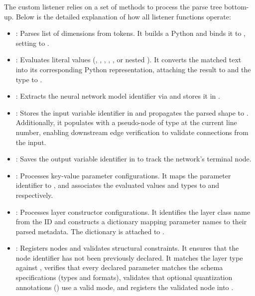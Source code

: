 \documentclass{nngraph-en}
\begin{document}
The custom listener relies on a set of  methods to process the parse tree bottom-up. Below is the detailed explanation of how all listener functions operate:

\begin{itemize}
    \item \textbf{}: Parses list of dimensions from  tokens. It builds a Python  and binds it to , setting  to .
    \item \textbf{}: Evaluates literal values (, , , , , or nested ). It converts the matched text into its corresponding Python representation, attaching the result to  and the type to .
    \item \textbf{}: Extracts the neural network model identifier via  and stores it in .
    \item \textbf{}: Stores the input variable identifier in  and propagates the parsed shape to . Additionally, it populates  with a pseudo-node of type  at the current line number, enabling downstream edge verification to validate connections from the input.
    \item \textbf{}: Saves the output variable identifier in  to track the network's terminal node.
    \item \textbf{}: Processes key-value parameter configurations. It maps the parameter identifier to , and associates the evaluated values and types to  and  respectively.
    \item \textbf{}: Processes layer constructor configurations. It identifies the layer class name from the ID and constructs a dictionary mapping parameter names to their parsed metadata. The dictionary is attached to .
    \item \textbf{}: Registers nodes and validates structural constraints. It ensures that the node identifier has not been previously declared. It matches the layer type against , verifies that every declared parameter matches the schema specifications (types and formats), validates that optional quantization annotations () use a valid mode, and registers the validated node into .

\end{itemize}
\end{document}
